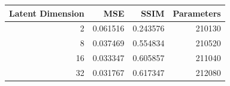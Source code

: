 \begin{tabular}{rrrr}
\toprule
Latent Dimension & MSE & SSIM & Parameters \\
\midrule
2 & 0.061516 & 0.243576 & 210130 \\
8 & 0.037469 & 0.554834 & 210520 \\
16 & 0.033347 & 0.605857 & 211040 \\
32 & 0.031767 & 0.617347 & 212080 \\
\bottomrule
\end{tabular}
